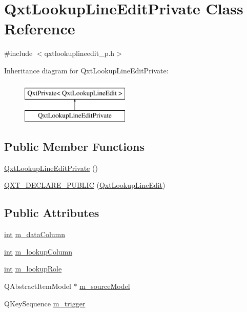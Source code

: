 \hypertarget{class_qxt_lookup_line_edit_private}{\section{Qxt\-Lookup\-Line\-Edit\-Private Class Reference}
\label{class_qxt_lookup_line_edit_private}
}


{\ttfamily \#include $<$qxtlookuplineedit\-\_\-p.\-h$>$}

Inheritance diagram for Qxt\-Lookup\-Line\-Edit\-Private\-:\begin{figure}[H]
\begin{center}
\leavevmode
\includegraphics[height=2.000000cm]{class_qxt_lookup_line_edit_private}
\end{center}
\end{figure}
\subsection*{Public Member Functions}
\begin{DoxyCompactItemize}
\item 
\hyperlink{class_qxt_lookup_line_edit_private_a242d83eb5019f9b18c21da5942367bb8}{Qxt\-Lookup\-Line\-Edit\-Private} ()
\item 
\hyperlink{class_qxt_lookup_line_edit_private_a219cba943922851453ee542cae89de5d}{Q\-X\-T\-\_\-\-D\-E\-C\-L\-A\-R\-E\-\_\-\-P\-U\-B\-L\-I\-C} (\hyperlink{class_qxt_lookup_line_edit}{Qxt\-Lookup\-Line\-Edit})
\end{DoxyCompactItemize}
\subsection*{Public Attributes}
\begin{DoxyCompactItemize}
\item 
\hyperlink{ioapi_8h_a787fa3cf048117ba7123753c1e74fcd6}{int} \hyperlink{class_qxt_lookup_line_edit_private_a8f3d2020f0174d0c732bd374176f4270}{m\-\_\-data\-Column}
\item 
\hyperlink{ioapi_8h_a787fa3cf048117ba7123753c1e74fcd6}{int} \hyperlink{class_qxt_lookup_line_edit_private_a471dc1e7fedca313523ff16c57f73b8d}{m\-\_\-lookup\-Column}
\item 
\hyperlink{ioapi_8h_a787fa3cf048117ba7123753c1e74fcd6}{int} \hyperlink{class_qxt_lookup_line_edit_private_a92a15c613bed15999fd0777de6b82b26}{m\-\_\-lookup\-Role}
\item 
Q\-Abstract\-Item\-Model $\ast$ \hyperlink{class_qxt_lookup_line_edit_private_a961eb3ea17900ef545424264d8532963}{m\-\_\-source\-Model}
\item 
Q\-Key\-Sequence \hyperlink{class_qxt_lookup_line_edit_private_a1b2e6e8551cc07c084efad80dda23ad7}{m\-\_\-trigger}
\end{DoxyCompactItemize}
